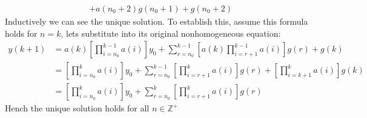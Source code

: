 \begin{itemize}
\begin{explanation}
\begin{align*}
                         & +a(n_0+2)g(n_0+1)+g(n_0+2)
            \end{align*}
            Inductively we can see the unique solution. To establish this, assume this formula holds for $n=k$, lets substitute into its original nonhomogeneous equation:
                \begin{align*}
                    y(k+1) & =a(k)\left[\prod_{i=n_0}^{k-1} a(i)\right]y_0+\sum_{r=n_0}^{k-1}\left[a(k)\prod_{i=r+1}^{k-1} a(i)\right]g(r)+g(k) \\
                           & =\left[\prod_{i=n_0}^k a(i)\right]y_0+\sum_{r=n_0}^{k-1}\left[\prod_{i=r+1}^k a(i)\right]g(r)+\left[\prod_{i=k+1}^k a(i)\right]g(k) \\
                           & =\left[\prod_{i=n_0}^k a(i)\right]y_0+\sum_{r=n_0}^k\left[\prod_{i=r+1}^k a(i)\right]g(r)
                \end{align*}
            Hench the unique solution holds for all $n\in\mathbb{Z}^+$
        \end{explanation}
\end{itemize}

